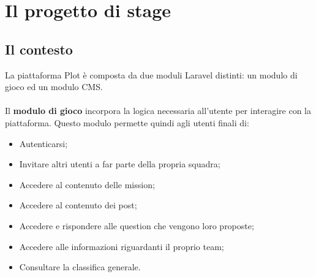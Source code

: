 
\chapter{Il progetto di stage}
\label{cap:progetto-stage}

\section{Il contesto}
\label{sec:contesto}
La piattaforma Plot è composta da due moduli Laravel distinti: un modulo di gioco ed un modulo CMS.
\\ \\
Il \textbf{modulo di gioco} incorpora la logica necessaria all'utente per interagire con la piattaforma. Questo modulo permette quindi agli utenti finali di:
\begin{itemize}
	\item Autenticarsi;
	\item Invitare altri utenti a far parte della propria squadra;
	\item Accedere al contenuto delle mission;
	\item Accedere al contenuto dei post;
	\item Accedere e rispondere alle question che vengono loro proposte;
	\item Accedere alle informazioni riguardanti il proprio team;
	\item Consultare la classifica generale.
\end{itemize}

